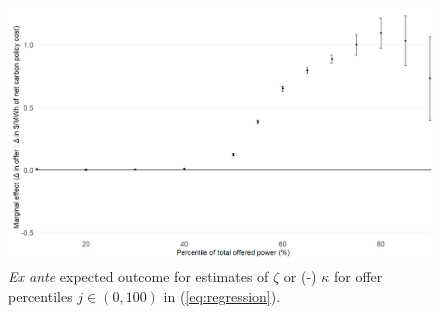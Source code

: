 \documentclass[12pt]{article}
\begin{document}
\begin{figure}[h]%
	\centering \vspace{-.25cm} \includegraphics[width=6.5in]{../images/expectation.png}
\vspace{-0.75cm}	\caption{\textit{Ex ante} expected outcome for estimates of $\zeta$ or (-) $\kappa$ for offer percentiles $j\in (0,100)$ in (\ref{eq:regression}).}
\label{fig:expectation}
\end{figure}
\end{document}
